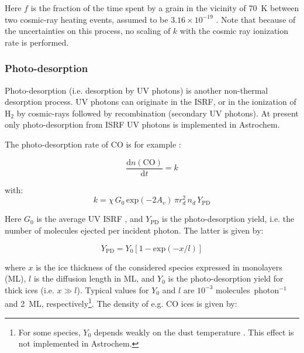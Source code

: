 \documentclass[a4paper,12pt]{article}
\newcommand{\conc}[1]{n(\mathrm{#1})}
\begin{document}
\noindent
Here $f$ is the fraction of the time spent by a grain in the vicinity
of 70~K between two cosmic-ray heating events, assumed to be $3.16
\times 10^{-19}$ \citep{Hasegawa93}. Note that because of the
uncertainties on this process, no scaling of $k$ with the cosmic ray
ionization rate is performed.

\subsubsection{Photo-desorption}
\label{sec:photo-desorption}

Photo-desorption (i.e. desorption by UV photons) is another
non-thermal desorption process. UV photons can originate in the ISRF,
or in the ionization of H$_{2}$ by cosmic-rays followed by
recombination (secondary UV photons). At present only photo-desorption
from ISRF UV photons is implemented in Astrochem.

The photo-desorption rate of CO is for example
\citep{Oberg09a,Oberg09b}:

\begin{equation}
  \frac{\mathrm{d} \conc{CO}}{\mathrm{d} t} = k
  \label{eq:photo-desorption-rate}
\end{equation}  

with:
\begin{equation}
  k = \chi \, G_{0} \, \mathrm{exp} \left( -2 A_{v} \right)
  \, \pi r_{d}^{2} \, n_{d} \, Y_\mathrm{PD}
  \label{eq:photo-desorption}
\end{equation}

\noindent
Here $G_{0}$ is the average UV ISRF \citep[assumed to be
10$^{8}$~photons~cm$^{-2}$~s$^{-1}$;][]{Habing68}, and $Y_\mathrm{PD}$
is the photo-desorption yield, i.e. the number of molecules ejected
per incident photon. The latter is given by:

\begin{equation}
  Y_\mathrm{PD} = Y_{0} \left[ 1 - \mathrm{exp} \left( -x / l \right) \right]
  \label{eq:photo-desorption-yield}
\end{equation}

\noindent
where $x$ is the ice thickness of the considered species expressed in
monolayers (ML), $l$ is the diffusion length in ML, and $Y_{0}$ is the
photo-desorption yield for thick ices (i.e. $x \gg l$). Typical values
for $Y_{0}$ and $l$ are $10^{-3}$ molecules~photon$^{-1}$ and 2~ML,
respectively\footnote{For some species, $Y_{0}$ depends weakly on the
  dust temperature \citep{Oberg09a}. This effect is not implemented in
  Astrochem.}. The density of e.g. CO ices is given by:
\end{document}
